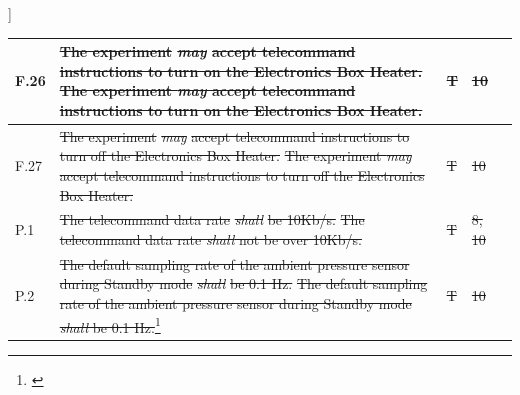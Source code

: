 ]\documentclass[a4paper,12pt,twoside]{article}
\providecommand{\DIFaddtex}[1]{{\protect\color{blue}\uwave{#1}}} %
\providecommand{\DIFdeltex}[1]{{\protect\color{red}\sout{#1}}}                      %
\providecommand{\DIFaddbegin}{} %
\providecommand{\DIFaddend}{} %
\providecommand{\DIFdelbegin}{} %
\providecommand{\DIFdelend}{} %
\providecommand{\DIFadd}[1]{\texorpdfstring{\DIFaddtex{#1}}{#1}} %
\providecommand{\DIFdel}[1]{\texorpdfstring{\DIFdeltex{#1}}{}} %
\newcommand{\DIFscaledelfig}{0.5}
\newlength{\DIFdelgraphicswidth} %
\newlength{\DIFdelgraphicsheight} %
\newcommand{\DIFaddincludegraphics}[2][]{{\color{blue}\fbox{\DIFOincludegraphics[#1]{#2}}}} %
\newcommand{\DIFdelincludegraphics}[2][]{%
\sbox{\DIFdelgraphicsbox}{\DIFOincludegraphics[#1]{#2}}%
\settoboxwidth{\DIFdelgraphicswidth}{\DIFdelgraphicsbox} %
\settoboxtotalheight{\DIFdelgraphicsheight}{\DIFdelgraphicsbox} %
\scalebox{\DIFscaledelfig}{%
\parbox[b]{\DIFdelgraphicswidth}{\usebox{\DIFdelgraphicsbox}\\[-\baselineskip] \rule{\DIFdelgraphicswidth}{0em}}\llap{\resizebox{\DIFdelgraphicswidth}{\DIFdelgraphicsheight}{%
\setlength{\unitlength}{\DIFdelgraphicswidth}%
\begin{picture}(1,1)%
\thicklines\linethickness{2pt} %
{\color[rgb]{1,0,0}\put(0,0){\framebox(1,1){}}}%
{\color[rgb]{1,0,0}\put(0,0){\line( 1,1){1}}}%
{\color[rgb]{1,0,0}\put(0,1){\line(1,-1){1}}}%
\end{picture}%
}\hspace*{3pt}}} %
} %
\DeclareRobustCommand{\DIFaddbegin}{\DIFOaddbegin \let\includegraphics\DIFaddincludegraphics} %
\DeclareRobustCommand{\DIFaddend}{\DIFOaddend \let\includegraphics\DIFOincludegraphics} %
\DeclareRobustCommand{\DIFdelbegin}{\DIFOdelbegin \let\includegraphics\DIFdelincludegraphics} %
\DeclareRobustCommand{\DIFdelend}{\DIFOaddend \let\includegraphics\DIFOincludegraphics} %
\begin{document}
\begin{longtable}[]{|m{}| m{} |m{} |m{}|m{}|}
F.26 & \DIFdelbegin \DIFdel{The experiment }\textit{\DIFdel{may}} %
\DIFdel{accept telecommand instructions to turn on the Electronics Box Heater.                                                                                    }\DIFdelend \DIFaddbegin \st{The experiment \textit{may} accept telecommand instructions to turn on the Electronics Box Heater.}\DIFadd{\textsuperscript{\ref{fn:unnecessary-requirement}}                                                                                     }\DIFaddend &      \DIFdelbegin \DIFdel{T        }\DIFdelend \DIFaddbegin \DIFadd{-        }\DIFaddend & \DIFdelbegin \DIFdel{10            }\DIFdelend \DIFaddbegin \DIFadd{-            }\DIFaddend &        \\ \hline
F.27 & \DIFdelbegin \DIFdel{The experiment }\textit{\DIFdel{may}} %
\DIFdel{accept telecommand instructions to turn off the Electronics Box Heater.                                                                                   }\DIFdelend \DIFaddbegin \st{The experiment \textit{may} accept telecommand instructions to turn off the Electronics Box Heater.}\DIFadd{\textsuperscript{\ref{fn:unnecessary-requirement}}                                                                                    }\DIFaddend &      \DIFdelbegin \DIFdel{T        }\DIFdelend \DIFaddbegin \DIFadd{-        }\DIFaddend & \DIFdelbegin \DIFdel{10            }\DIFdelend \DIFaddbegin \DIFadd{-            }\DIFaddend &        \\ \hline
P.1  & \DIFdelbegin \DIFdel{The telecommand data rate }\textit{\DIFdel{shall}} %
\DIFdel{be 10Kb/s.                                                                                                                          }\DIFdelend \DIFaddbegin \st{The telecommand data rate \textit{shall} not be over 10Kb/s.}\DIFadd{\textsuperscript{\ref{fn:design-requirement}}                                                                                                                           }\DIFaddend &        \DIFdelbegin \DIFdel{T      }\DIFdelend \DIFaddbegin \DIFadd{-      }\DIFaddend & \DIFdelbegin \DIFdel{8, 10            }\DIFdelend \DIFaddbegin \DIFadd{-          }\DIFaddend &        \\ \hline
P.2  & \DIFdelbegin \DIFdel{The default sampling rate of the ambient pressure sensor during Standby mode }\textit{\DIFdel{shall}} %
\DIFdel{be 0.1 Hz.                                                                           }\DIFdelend \DIFaddbegin \st{The default sampling rate of the ambient pressure sensor during Standby mode \textit{shall} be 0.1 Hz.}\footnote{\DIFadd{Replaced by P.23}\label{replaceSoftVeri}}                                                                       \DIFaddend &      \DIFdelbegin \DIFdel{T        }\DIFdelend \DIFaddbegin \DIFadd{-  }\DIFaddend & \DIFdelbegin \DIFdel{10            }\DIFdelend \DIFaddbegin \DIFadd{-  }\DIFaddend &        \\ \hline

\end{longtable}
\end{document}
